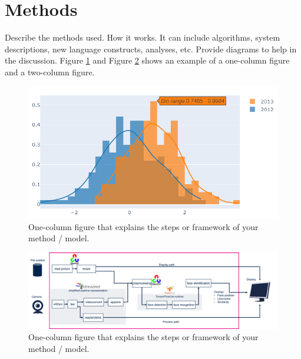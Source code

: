 \section{Methods}
Describe the methods used. How it works. It can include algorithms, system descriptions, new language constructs, analyses, etc.
Provide diagrams to help in the discussion. Figure \ref{fig:one-col-figure} and Figure \ref{fig:two-col-figure} shows an example of a one-column figure and a two-column figure. 
\begin{figure}
    \centering
    \includegraphics[width=\linewidth]{figures/example_plot.png}
    \caption{One-column figure that explains the steps or framework of your method / model.}
    \label{fig:one-col-figure}
\end{figure}

\begin{figure}
    \centering
    \includegraphics[width=\linewidth]{figures/example_pipeline.png}
    \caption{One-column figure that explains the steps or framework of your method / model.}
    \label{fig:two-col-figure}
\end{figure}
